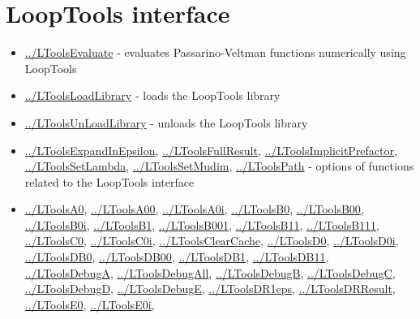 \documentclass[../FeynHelpersManual.tex]{subfiles}
\begin{document}
\hypertarget{looptools interface}{
\section{LoopTools interface}\label{looptools interface}}

\begin{itemize}
\tightlist
\item
  \hyperlink{../ltoolsevaluate}{../LToolsEvaluate} - evaluates
  Passarino-Veltman functions numerically using LoopTools
\item
  \hyperlink{../ltoolsloadlibrary}{../LToolsLoadLibrary} - loads the
  LoopTools library
\item
  \hyperlink{../ltoolsunloadlibrary}{../LToolsUnLoadLibrary} - unloads
  the LoopTools library
\item
  \hyperlink{../ltoolsexpandinepsilon}{../LToolsExpandInEpsilon},
  \hyperlink{../ltoolsfullresult}{../LToolsFullResult},
  \hyperlink{../ltoolsimplicitprefactor}{../LToolsImplicitPrefactor},
  \hyperlink{../ltoolssetlambda}{../LToolsSetLambda},
  \hyperlink{../ltoolssetmudim}{../LToolsSetMudim},
  \hyperlink{../ltoolspath}{../LToolsPath} - options of functions
  related to the LoopTools interface
\item
  \hyperlink{../ltoolsa0}{../LToolsA0},
  \hyperlink{../ltoolsa00}{../LToolsA00},
  \hyperlink{../ltoolsa0i}{../LToolsA0i},
  \hyperlink{../ltoolsb0}{../LToolsB0},
  \hyperlink{../ltoolsb00}{../LToolsB00},
  \hyperlink{../ltoolsb0i}{../LToolsB0i},
  \hyperlink{../ltoolsb1}{../LToolsB1},
  \hyperlink{../ltoolsb001}{../LToolsB001},
  \hyperlink{../ltoolsb11}{../LToolsB11},
  \hyperlink{../ltoolsb111}{../LToolsB111},
  \hyperlink{../ltoolsc0}{../LToolsC0},
  \hyperlink{../ltoolsc0i}{../LToolsC0i},
  \hyperlink{../ltoolsclearcache}{../LToolsClearCache},
  \hyperlink{../ltoolsd0}{../LToolsD0},
  \hyperlink{../ltoolsd0i}{../LToolsD0i},
  \hyperlink{../ltoolsdb0}{../LToolsDB0},
  \hyperlink{../ltoolsdb00}{../LToolsDB00},
  \hyperlink{../ltoolsdb1}{../LToolsDB1},
  \hyperlink{../ltoolsdb11}{../LToolsDB11},
  \hyperlink{../ltoolsdebuga}{../LToolsDebugA},
  \hyperlink{../ltoolsdebugall}{../LToolsDebugAll},
  \hyperlink{../ltoolsdebugb}{../LToolsDebugB},
  \hyperlink{../ltoolsdebugc}{../LToolsDebugC},
  \hyperlink{../ltoolsdebugd}{../LToolsDebugD},
  \hyperlink{../ltoolsdebuge}{../LToolsDebugE},
  \hyperlink{../ltoolsdr1eps}{../LToolsDR1eps},
  \hyperlink{../ltoolsdrresult}{../LToolsDRResult},
  \hyperlink{../ltoolse0}{../LToolsE0},
  \hyperlink{../ltoolse0i}{../LToolsE0i},

\end{itemize}
\end{document}
